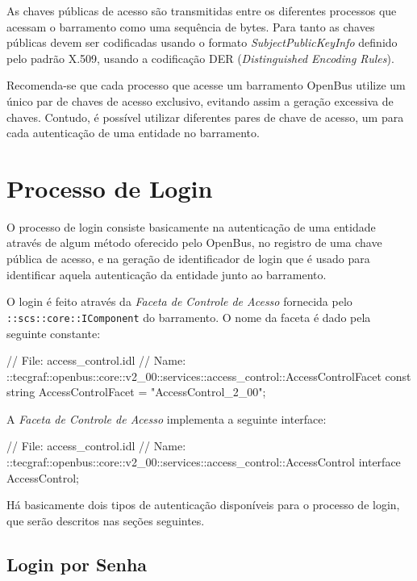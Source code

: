 \documentclass[]{article}
\newcommand{\term}[1]{\textit{#1}}
\newcommand{\code}[1]{\texttt{#1}}
\begin{document}
As chaves públicas de acesso são transmitidas entre os diferentes processos que acessam o barramento como uma sequência de bytes.
Para tanto as chaves públicas devem ser codificadas usando o formato \term{SubjectPublicKeyInfo} definido pelo padrão X.509, usando a codificação DER (\term{Distinguished Encoding Rules}).

Recomenda-se que cada processo que acesse um barramento OpenBus utilize um único par de chaves de acesso exclusivo, evitando assim a geração excessiva de chaves. Contudo, é possível utilizar diferentes pares de chave de acesso, um para cada autenticação de uma entidade no barramento.


\section{Processo de Login} %
\label{sec:processo_de_login}

O processo de login consiste basicamente na autenticação de uma entidade através de algum método oferecido pelo OpenBus, no registro de uma chave pública de acesso, e na geração de identificador de login que é usado para identificar aquela autenticação da entidade junto ao barramento.

O login é feito através da \term{Faceta de Controle de Acesso} fornecida pelo \code{::scs::core::IComponent} do barramento.
O nome da faceta é dado pela seguinte constante:

\begin{samplecode}[language={[CORBA]idl}]
// File: access_control.idl
// Name: ::tecgraf::openbus::core::v2_00::services::access_control::AccessControlFacet
const string AccessControlFacet = "AccessControl_2_00";
\end{samplecode}

A \term{Faceta de Controle de Acesso} implementa a seguinte interface:

\begin{samplecode}[language={[CORBA]idl}]
// File: access_control.idl
// Name: ::tecgraf::openbus::core::v2_00::services::access_control::AccessControl
interface AccessControl;
\end{samplecode}

Há basicamente dois tipos de autenticação disponíveis para o processo de login, que serão descritos nas seções seguintes.

\subsection{Login por Senha} %
\label{sub:login_por_senha}
\end{document}
